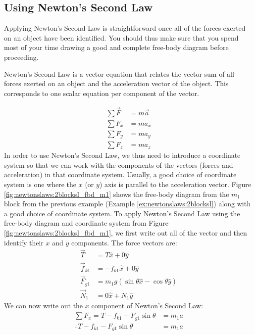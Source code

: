 \subsection{Using Newton's Second Law}
Applying Newton's Second Law is straightforward once all of the forces exerted on an object have been identified. You should thus make sure that you spend most of your time drawing a good and complete free-body diagram before proceeding.

Newton's Second Law is a vector equation that relates the vector sum of all forces exerted on an object and the acceleration vector of the object. This corresponds to one scalar equation per component of the vector.

\begin{align*}
\sum \vec F &=m\vec a\\
\sum F_x &= ma_x \\
\sum F_y &= ma_y \\
\sum F_z &= ma_z
\end{align*}
In order to use Newton's Second Law, we thus need to introduce a coordinate system so that we can work with the components of the vectors (forces and acceleration) in that coordinate system. Usually, a good choice of coordinate system is one where the $x$ (or $y$) axis is parallel to the acceleration vector. Figure \ref{fig:newtonslaws:2blocksI_fbd_m1} shows the free-body diagram from the $m_1$ block from the previous example (Example \ref{ex:newtonslaws:2blocksI}) along with a good choice of coordinate system. 
To apply Newton's Second Law using the free-body diagram and coordinate system from Figure \ref{fig:newtonslaws:2blocksI_fbd_m1}, we first write out all of the vector and then identify their $x$ and $y$ components. The force vectors are:
\begin{align*}
\vec T &= T\hat x+0\hat y\\
\vec f_{k1}&=-f_{k1}\hat x+0\hat y\\
\vec F_{g1}&=m_1g(\sin\theta \hat x-\cos\theta \hat y)\\
\vec N_1&=0\hat x+N_1\hat y
\end{align*}
We can now write out the $x$ component of Newton's Second Law:
\begin{align*}
\sum F_x = T-f_{k1}-F_{g1}\sin\theta &= m_1 a\\
\therefore T-f_{k1}-F_{g1}\sin\theta &= m_1 a
\end{align*}
